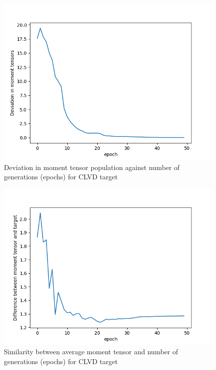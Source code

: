 \documentclass{article}
\begin{document}
\begin{figure}[H]
	\centering
	\includegraphics{dataSet2/MTDeviation.png}
	\caption{Deviation in moment tensor population against number of generations (epochs) for CLVD target}
	\label{MTDCLVD}
\end{figure}

\begin{figure}[H]
	\centering
	\includegraphics{dataSet2/MTsimilarity.png}
	\caption{Similarity between average moment tensor and number of generations (epochs) for CLVD target}
	\label{MTSCLVD}
\end{figure}
\end{document}
